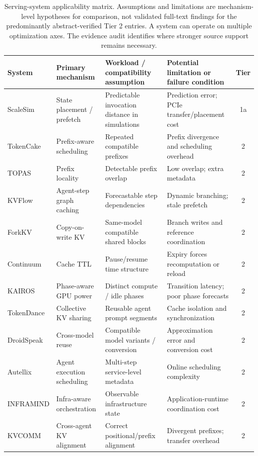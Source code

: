 \begin{table}[t]
\centering
\caption{Serving-system applicability matrix. Assumptions and limitations are mechanism-level hypotheses for comparison, not validated full-text findings for the predominantly abstract-verified Tier 2 entries. A system can operate on multiple optimization axes. The evidence audit identifies where stronger source support remains necessary.}
\label{tab:infrastructure}
\scriptsize
\setlength{\tabcolsep}{3pt}
\begin{tabularx}{\textwidth}{@{}p{}p{}p{}Xc@{}}
\toprule
\textbf{System} & \textbf{Primary mechanism} & \textbf{Workload / compatibility assumption} & \textbf{Potential limitation or failure condition} & \textbf{Tier} \\
\midrule
ScaleSim & State placement / prefetch & Predictable invocation distance in simulations & Prediction error; PCIe transfer/placement cost & 1a \\
TokenCake & Prefix-aware scheduling & Repeated compatible prefixes & Prefix divergence and scheduling overhead & 2 \\
TOPAS & Prefix locality & Detectable prefix overlap & Low overlap; extra metadata & 2 \\
KVFlow & Agent-step graph caching & Forecastable step dependencies & Dynamic branching; stale prefetch & 2 \\
ForkKV & Copy-on-write KV & Same-model compatible shared blocks & Branch writes and reference coordination & 2 \\
Continuum & Cache TTL & Pause/resume time structure & Expiry forces recomputation or reload & 2 \\
KAIROS & Phase-aware GPU power & Distinct compute / idle phases & Transition latency; poor phase forecasts & 2 \\
TokenDance & Collective KV sharing & Reusable agent prompt segments & Cache isolation and synchronization & 2 \\
DroidSpeak & Cross-model reuse & Compatible model variants / conversion & Approximation error and conversion cost & 2 \\
Autellix & Agent execution scheduling & Multi-step service-level metadata & Online scheduling complexity & 2 \\
INFRAMIND & Infra-aware orchestration & Observable infrastructure state & Application-runtime coordination cost & 2 \\
KVCOMM & Cross-agent KV alignment & Correct positional/prefix alignment & Divergent prefixes; transfer overhead & 2 \\

\end{tabularx}
\end{table}
